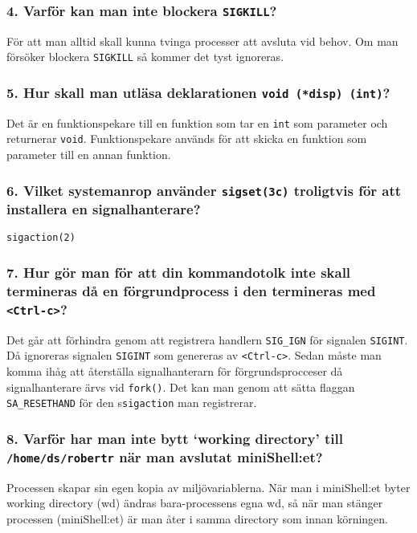 \documentclass[a4paper]{article}
\begin{document}
\subsubsection*{4. Varför kan man inte blockera \texttt{SIGKILL}?}
För att man alltid skall kunna tvinga processer att avsluta vid behov. Om man försöker blockera \texttt{SIGKILL} så kommer det tyst ignoreras.

\subsubsection*{5. Hur skall man utläsa deklarationen \texttt{void (*disp) (int)}?}
Det är en funktionspekare till en funktion som tar en \texttt{int} som parameter och returnerar \texttt{void}. Funktionspekare används för att skicka en funktion som parameter till en annan funktion.

\subsubsection*{6. Vilket systemanrop använder \texttt{sigset(3c)} troligtvis för att installera en signalhanterare?}
\texttt{sigaction(2)} 

\subsubsection*{7. Hur gör man för att din kommandotolk inte skall termineras då en förgrundprocess i den termineras med \texttt{<Ctrl-c>}?}
Det går att förhindra genom att registrera handlern \texttt{SIG_IGN} för signalen \texttt{SIGINT}. Då ignoreras signalen \texttt{SIGINT} 
som genereras av \texttt{<Ctrl-c>}. Sedan måste man komma ihåg att återställa signalhanterarn för förgrundsprocceser då signalhanterare ärvs vid \texttt{fork()}. 
Det kan man genom att sätta flaggan \texttt{SA_RESETHAND} för den s\texttt{sigaction} man registrerar.
 

\subsubsection*{8. Varför har man inte bytt `working directory' till \texttt{/home/ds/robertr} när man avslutat miniShell:et?}
Processen skapar sin egen kopia av miljövariablerna. När man i miniShell:et byter working directory (wd) ändras bara-processens egna wd, så när man stänger processen (miniShell:et) är man åter i samma directory som innan körningen.
\end{document}
